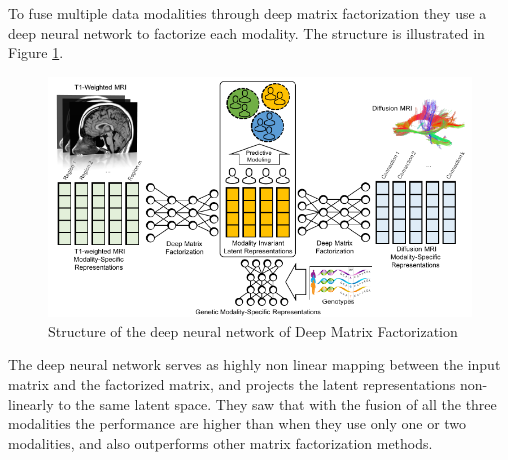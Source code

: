 To fuse multiple data modalities through deep matrix factorization they use a deep neural network to factorize each modality. The structure is illustrated in Figure \ref{fig:diagram17}.

\begin{figure}[htbp]
	\centering
	\includegraphics[scale=0.65]{Immagini/multimodality.PNG}
	\caption{Structure of the deep neural network of Deep Matrix Factorization}
	\label{fig:diagram17}
\end{figure}

The deep neural network serves as highly non linear mapping between the input matrix and the factorized matrix, and projects the latent representations non-linearly to the same latent space. 
They saw that with the fusion of all the three modalities the performance are higher than when they use only one or two modalities, and also outperforms other matrix factorization methods.